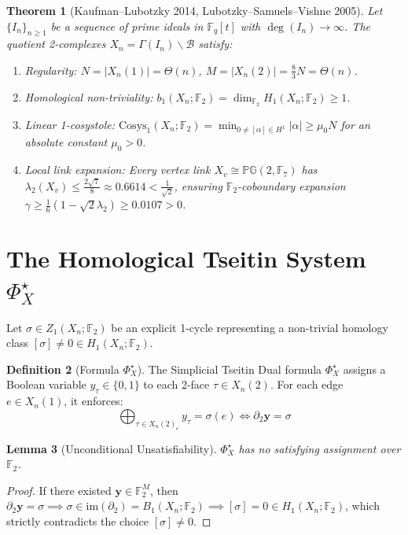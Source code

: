 \documentclass[11pt,a4paper]{article}
\newtheorem{theorem}{Theorem}[section]
\newtheorem{lemma}[theorem]{Lemma}
\theoremstyle{definition}
\newtheorem{definition}[theorem]{Definition}
\newcommand{\Cosys}{\mathrm{Cosys}}
\newcommand{\im}{\mathrm{im}}
\begin{document}
\begin{theorem}[Kaufman--Lubotzky 2014, Lubotzky--Samuels--Vishne 2005]
Let $\{I_n\}_{n \ge 1}$ be a sequence of prime ideals in $\mathbb{F}_q[t]$ with $\deg(I_n) \to \infty$. The quotient 2-complexes $X_n = \Gamma(I_n) \backslash \mathcal{B}$ satisfy:
\begin{enumerate}
\item Regularity: $N = |X_n(1)| = \Theta(n)$, $M = |X_n(2)| = \frac{8}{3}N = \Theta(n)$.
\item Homological non-triviality: $b_1(X_n; \mathbb{F}_2) = \dim_{\mathbb{F}_2} H_1(X_n; \mathbb{F}_2) \ge 1$.
\item Linear 1-cosystole: $\Cosys_1(X_n; \mathbb{F}_2) = \min_{0 \neq [\alpha] \in H^1} |\alpha| \ge \mu_0 N$ for an absolute constant $\mu_0 > 0$.
\item Local link expansion: Every vertex link $X_v \cong \mathbb{PG}(2, \mathbb{F}_7)$ has $\lambda_2(X_v) \le \frac{2\sqrt{7}}{8} \approx 0.6614 < \frac{1}{\sqrt{2}}$, ensuring $\mathbb{F}_2$-coboundary expansion $\gamma \ge \frac{1}{6}(1 - \sqrt{2}\lambda_2) \ge 0.0107 > 0$.
\end{enumerate}
\end{theorem}

\section{The Homological Tseitin System $\Phi_X^\star$}
Let $\sigma \in Z_1(X_n; \mathbb{F}_2)$ be an explicit 1-cycle representing a non-trivial homology class $[\sigma] \neq 0 \in H_1(X_n; \mathbb{F}_2)$.
\begin{definition}[Formula $\Phi_X^\star$]
The Simplicial Tseitin Dual formula $\Phi_X^\star$ assigns a Boolean variable $y_\tau \in \{0, 1\}$ to each 2-face $\tau \in X_n(2)$. For each edge $e \in X_n(1)$, it enforces:
$$\bigoplus_{\tau \in X_n(2)_e} y_\tau = \sigma(e) \iff \partial_2 \mathbf{y} = \sigma$$
\end{definition}

\begin{lemma}[Unconditional Unsatisfiability]
$\Phi_X^\star$ has no satisfying assignment over $\mathbb{F}_2$.
\end{lemma}
\begin{proof}
If there existed $\mathbf{y} \in \mathbb{F}_2^M$, then $\partial_2 \mathbf{y} = \sigma \implies \sigma \in \im(\partial_2) = B_1(X_n; \mathbb{F}_2) \implies [\sigma] = 0 \in H_1(X_n; \mathbb{F}_2)$, which strictly contradicts the choice $[\sigma] \neq 0$.
\end{proof}
\end{document}
